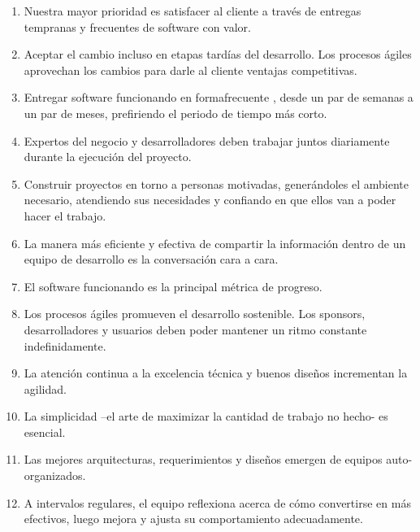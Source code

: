 \begin{enumerate}[1.]
	\item   Nuestra mayor prioridad es satisfacer al cliente a través 
	de   entregas     tempranas      y  frecuentes     de   software    con 
	valor.

	\item  Aceptar       el   cambio      incluso     en   etapas     tardías    del 
	desarrollo.   Los   procesos   ágiles   aprovechan   los   cambios 
	para darle al cliente ventajas competitivas.
	\item  Entregar software funcionando en formafrecuente , desde 
	un   par   de   semanas   a   un   par   de   meses,   prefiriendo   el 
	periodo de tiempo más corto.
	\item   Expertos     del   negocio    y  desarrolladores      deben    trabajar 
	juntos diariamente durante la ejecución del proyecto.
	\item   Construir      proyectos     en   torno    a  personas     motivadas, 
	generándoles       el   ambiente      necesario,     atendiendo      sus 
	necesidades y confiando en que ellos van a poder hacer 
	el trabajo.
	\item  La    manera     más    eficiente   y   efectiva    de  compartir      la 
	información       dentro   de   un   equipo    de   desarrollo    es   la 
	conversación cara a cara.
	\item  El   software      funcionando      es   la   principal    métrica    de 
	progreso.
	\item  Los procesos ágiles promueven el desarrollo sostenible. 
	Los     sponsors,    desarrolladores      y  usuarios    deben    poder 
	mantener un ritmo constante indefinidamente.
	\item  La   atención   continua   a   la   excelencia   técnica   y   buenos 
	diseños incrementan la agilidad.
	\item  La   simplicidad    –el    arte  de   maximizar      la  cantidad    de 
	trabajo no hecho- es esencial.
	\item  Las    mejores     arquitecturas,     requerimientos       y   diseños 
	emergen de equipos auto-organizados.
	\item  A   intervalos   regulares,   el   equipo   reflexiona   acerca   de 
	cómo convertirse en más efectivos, luego mejora y ajusta 
	su comportamiento adecuadamente.
\end{enumerate}

